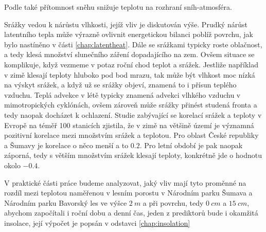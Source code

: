 Podle \cite{zhangwei2021} také přítomnost sněhu snižuje teplotu na rozhraní sníh-atmosféra.


Srážky vedou k nárůstu vlhkosti, jejíž vliv je diskutován výše. Prudký nárůst latentního tepla může výrazně ovlivnit energetickou bilanci poblíž povrchu, jak bylo nastíněno v části \ref{chap:latentheat}. Dále se srážkami typicky roste oblačnost, a tedy klesá množství slunečního záření dopadajícího na zem. Ovšem situace se komplikuje, když vezmeme v potaz roční chod teplot a srážek. Jestliže například v zimě klesají teploty hluboko pod bod mrazu, tak může být vlhkost moc nízká na výskyt srážek, a když už se srážky objeví, znamená to i přísun teplého vzduchu. Teplá advekce v létě typicky znamená advekci vlhkého vzduchu v mimotropických cyklónách, ovšem zároveň může srážky přinést studená fronta a tedy naopak docházet k ochlazení. Studie zabývající se korelací srážek a teploty v Evropě na téměř 100 stanicích zjistila, že v zimě na většině území je významná pozitivní korelace mezi množstvím srážek a teplotou. Pro oblast České republiky a Šumavy je korelace o něco menší a to $0.2$. Pro letní období je pak naopak záporná, tedy s větším množstvím srážek klesají teploty, konkrétně jde o hodnotu okolo $-0.4$\cite{maddenroland1978}.

V praktické části práce budeme analyzovat, jaký vliv mají tyto proměnné na rozdíl mezi teplotou naměřenou v lesním porostu v Národním parku Šumava a Národním parku Bavorský les ve výšce $\SI{2}{m}$ a při povrchu, tedy $\SI{0}{cm}$ a $\SI{15}{cm}$, abychom započítali i roční dobu a denní čas, jeden z prediktorů bude i okamžitá insolace, její výpočet je popsán v odstavci \ref{chap:insolation}

